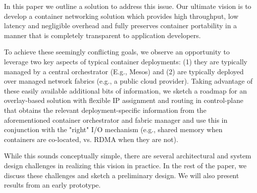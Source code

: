 In this paper we outline a solution to address this issue.  Our ultimate vision
is to develop a container networking solution which provides high throughput,
low latency and negligible overhead and fully preserves container portability in
a manner that is completely transparent to application developers. 

To achieve these seemingly conflicting goals, we observe an opportunity to
leverage two key aspects of typical container deployments: (1) they are
typically managed by a central orchestrator (E.g., Mesos) and (2) are typically
deployed over managed network fabrics (e.g., a public cloud provider). Taking
advantage of these easily available additional bits of information, we sketch a
roadmap for an overlay-based solution  with flexible IP assignment and routing
in control-plane  that obtains the relevant
deployment-specific information from the aforementioned container orchestrator
and fabric manager and use this in conjunction with the "right" I/O mechanism
(e.g., shared memory when containers are co-located, vs. RDMA when they are
not). 

While this sounds conceptually simple, there are several architectural
and system design challenges in realizing this vision in practice. In the rest
of the paper, we discuss these challenges and sketch a preliminary design. We
will also present results from an early prototype.
